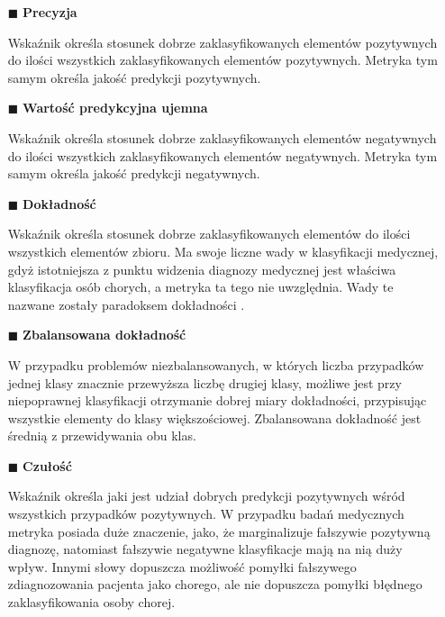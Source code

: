 \begin{itemize}
    \item[$\blacksquare$] \textbf{Precyzja} 
    \par Wskaźnik określa stosunek dobrze zaklasyfikowanych elementów pozytywnych do ilości wszystkich zaklasyfikowanych elementów pozytywnych. Metryka tym samym określa jakość predykcji pozytywnych. 
    \par 

    \item[$\blacksquare$] \textbf{Wartość predykcyjna ujemna} 
    \par Wskaźnik określa stosunek dobrze zaklasyfikowanych elementów negatywnych do ilości wszystkich zaklasyfikowanych elementów negatywnych. Metryka tym samym określa jakość predykcji negatywnych. 
    \par 
    
    \item[$\blacksquare$] \textbf{Dokładność} 
    \par Wskaźnik określa stosunek dobrze zaklasyfikowanych elementów do ilości wszystkich  elementów zbioru. Ma swoje liczne wady w klasyfikacji medycznej, gdyż istotniejsza z punktu widzenia diagnozy medycznej jest właściwa klasyfikacja osób chorych, a metryka ta tego nie uwzględnia. Wady te nazwane zostały paradoksem dokładności .
    \par 

    \item[$\blacksquare$] \textbf{Zbalansowana dokładność} 
    \par W przypadku problemów niezbalansowanych, w których liczba przypadków jednej klasy znacznie przewyższa liczbę drugiej klasy, możliwe jest przy niepoprawnej klasyfikacji otrzymanie dobrej miary dokładności, przypisując wszystkie elementy do klasy większościowej. Zbalansowana dokładność jest średnią z przewidywania obu klas.
    \par 
    
    \item[$\blacksquare$] \textbf{Czułość} 
    \par Wskaźnik określa jaki jest udział dobrych predykcji pozytywnych wśród wszystkich przypadków pozytywnych. W przypadku badań medycznych metryka posiada duże znaczenie, jako, że marginalizuje fałszywie pozytywną diagnozę, natomiast fałszywie negatywne klasyfikacje mają na nią duży wpływ. Innymi słowy dopuszcza możliwość pomyłki fałszywego zdiagnozowania pacjenta jako chorego, ale nie dopuszcza pomyłki błędnego zaklasyfikowania osoby chorej.
    \par 


\end{itemize}

